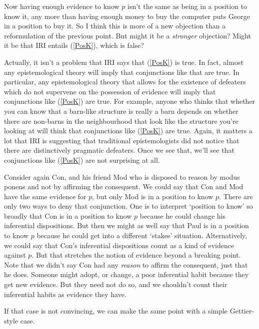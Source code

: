 \noindent Now having enough evidence to know $p$ isn't the same as being in a position to know it, any more than having enough money to buy the computer puts George in a position to buy it. So I think this is more of a new objection than a reformulation of the previous point. But might it be a \textit{stronger} objection? Might it be that IRI entails (\ref{PosK}), which is false?


\noindent Actually, it isn't a problem that IRI says that (\ref{PosK}) is true. In fact, almost any epistemological theory will imply that conjunctions like that are true. In particular, any epistemological theory that allows for the existence of defeaters which do not supervene on the possession of evidence will imply that conjunctions like (\ref{PosK}) are true. For example, anyone who thinks that whether you can know that a barn-like structure is really a barn depends on whether there are non-barns in the neighbourhood that look like the structure you're looking at will think that conjunctions like (\ref{PosK}) are true. Again, it matters a lot that IRI is suggesting that traditional epistemologists did not notice that there are distinctively pragmatic defeaters. Once we see that, we'll see that conjunctions like (\ref{PosK}) are not surprising at all.

Consider again Con, and his friend Mod who is disposed to reason by modus ponens and not by affirming the consequent. We could say that Con and Mod have the same evidence for $p$, but only Mod is in a position to know $p$. There are only two ways to deny that conjunction. One is to interpret `position to know' so broadly that Con is in a position to know $p$ because he could change his inferential dispositions. But then we might as well say that Paul is in a position to know $p$ because he could get into a different `stakes' situation. Alternatively, we could say that Con's inferential dispositions count as a kind of evidence against $p$. But that stretches the notion of evidence beyond a breaking point. Note that we didn't say Con had any \textit{reason} to affirm the consequent, just that he does. Someone might adopt, or change, a poor inferential habit because they get new evidence. But they need not do so, and we shouldn't count their inferential habits as evidence they have.

If that case is not convincing, we can make the same point with a simple Gettier-style case.


